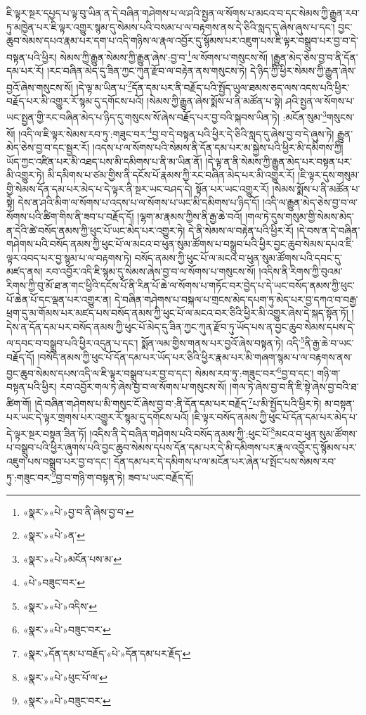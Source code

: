 ཇི་ལྟར་སྔར་དཔྱད་པ་ལྟ་བུ་ཡིན་ན་དེ་བཞིན་གཤེགས་པ་ལ་ཤའི་སྤྱན་ལ་སོགས་པ་མངའ་བ་དང་སེམས་ཀྱི་རྒྱུན་རབ་ཏུ་མཁྱེན་པར་ཇི་ལྟར་འགྱུར་སྙམ་དུ་སེམས་པའི་བསམ་པ་ལ་བརྟགས་ནས་དེ་ཅིའི་སླད་དུ་ཞེས་ཞུས་པ་དང་། བྱང་ཆུབ་སེམས་དཔའ་རྣམ་པར་དག་པ་འདི་གཉིས་ལ་རྣལ་འབྱོར་དུ་སྙོམས་པར་འཇུག་པས་ཇི་ལྟར་བསྒྲུབ་པར་བྱ་བ་དེ་བསྟན་པའི་ཕྱིར། སེམས་ཀྱི་རྒྱུན་སེམས་ཀྱི་རྒྱུན་ཞེས་:བྱ་བ་\footnote{«སྣར་»«པེ་»བྱ་བ་ནི་ཞེས་བྱ་བ་}ལ་སོགས་པ་གསུངས་སོ། །རྒྱུན་མེད་ཅེས་བྱ་བ་ནི་དོན་དམ་པར་རོ། །རང་བཞིན་མེད་དུ་ཟིན་ཀྱང་ཀུན་རྫོབ་ལ་བརྟེན་ནས་གསུངས་ཏེ། དེ་ཉིད་ཀྱི་ཕྱིར་སེམས་ཀྱི་རྒྱུན་ཞེས་བྱའོ་ཞེས་གསུངས་སོ། །དེ་ལྟ་མ་ཡིན་པ་\footnote{«སྣར་»«པེ་»ན་}དོན་དམ་པར་ནི་བརྗོད་པའི་སྤྱོད་ཡུལ་ཐམས་ཅད་ལས་འདས་པའི་ཕྱིར་བརྗོད་པར་མི་འགྱུར་རོ་སྙམ་དུ་དགོངས་པའོ། །སེམས་ཀྱི་རྒྱུན་ཞེས་སྨོས་པ་ནི་མཚོན་པ་སྟེ། ཤའི་སྤྱན་ལ་སོགས་པ་ཡང་སྤྱན་གྱི་རང་བཞིན་མེད་པ་ཉིད་དུ་གསུངས་སོ་ཞེས་བརྗོད་པར་བྱ་བའི་སྐབས་ཡིན་ཏེ། :མངོན་སུམ་\footnote{«སྣར་»«པེ་»མངོན་པས་མ་}གསུངས་སོ། །འདི་ལ་ཇི་ལྟར་སེམས་རབ་ཏུ་:གཟུང་བར་\footnote{«པེ་»བཟུང་བར་}བྱ་བ་དེ་བསྟན་པའི་ཕྱིར་དེ་ཅིའི་སླད་དུ་ཞེས་བྱ་བ་དེ་ཞུས་ཏེ། རྒྱུན་མེད་ཅེས་བྱ་བ་དང་སྦྱར་རོ། །འདས་པ་ལ་སོགས་པའི་སེམས་ནི་དོན་དམ་པར་མ་སྐྱེས་པའི་ཕྱིར་མི་དམིགས་ཀྱི། ཡོད་ཀྱང་འཛིན་པར་མི་འཐད་པས་མི་དམིགས་པ་ནི་མ་ཡིན་ནོ། །དེ་ལྟ་ན་ནི་སེམས་ཀྱི་རྒྱུན་མེད་པར་བསྟན་པར་མི་འགྱུར་ཏེ། མི་དམིགས་པ་ཙམ་གྱིས་ནི་དངོས་པོ་རྣམས་ཀྱི་རང་བཞིན་མེད་པར་མི་འགྱུར་རོ། །ཇི་ལྟར་དུས་གསུམ་གྱི་སེམས་དོན་དམ་པར་མེད་པ་དེ་ལྟར་ནི་སྔར་ཡང་བཤད་དེ། སྟོན་པར་ཡང་འགྱུར་རོ། །སེམས་སྨོས་པ་ནི་མཚོན་པ་སྟེ། དེས་ན་ཤའི་མིག་ལ་སོགས་པ་འདས་པ་ལ་སོགས་པ་ཡང་མི་དམིགས་པ་ཉིད་དོ། །འདི་ལ་རྒྱུན་མེད་ཅེས་བྱ་བ་ལ་སོགས་པའི་ཚིག་གིས་ནི་ཟབ་པ་བརྗོད་དོ། །ལྷག་མ་རྣམས་ཀྱིས་ནི་རྒྱ་ཆེ་བའོ། །གལ་ཏེ་དུས་གསུམ་གྱི་སེམས་མེད་ན་དེའི་ཚེ་བསོད་ནམས་ཀྱི་ཕུང་པོ་ཡང་མེད་པར་འགྱུར་ཏེ། དེ་ནི་སེམས་ལ་བརྟེན་པའི་ཕྱིར་རོ། །དེ་བས་ན་དེ་བཞིན་གཤེགས་པའི་བསོད་ནམས་ཀྱི་ཕུང་པོ་ལ་མངའ་བ་ཕུན་སུམ་ཚོགས་པ་བསྒྲུབ་པའི་ཕྱིར་བྱང་ཆུབ་སེམས་དཔའ་ཇི་ལྟར་འབད་པར་བྱ་སྙམ་པ་ལ་བརྟགས་ཏེ། བསོད་ནམས་ཀྱི་ཕུང་པོ་ལ་མངའ་བ་ཕུན་སུམ་ཚོགས་པའི་དབང་དུ་མཛད་ནས། རབ་འབྱོར་འདི་ཇི་སྙམ་དུ་སེམས་ཞེས་བྱ་བ་ལ་སོགས་པ་གསུངས་སོ། །འདིས་ནི་རིགས་ཀྱི་བུའམ་རིགས་ཀྱི་བུ་མོ་ཐ་ན་གང་ཕྱིའི་དངོས་པོ་ནི་རིན་པོ་ཆེ་ལ་སོགས་པ་གཏོང་བར་བྱེད་པ་དེ་ཡང་བསོད་ནམས་ཀྱི་ཕུང་པོ་ཆེན་པོ་དང་ལྡན་པར་འགྱུར་ན། དེ་བཞིན་གཤེགས་པ་བསྐལ་པ་གྲངས་མེད་དཔག་ཏུ་མེད་པར་བྱ་དཀའ་བ་བརྒྱ་ཕྲག་དུ་མ་གོམས་པར་མཛད་པས་བསོད་ནམས་ཀྱི་ཕུང་པོ་ལ་མངའ་བར་ཅིའི་ཕྱིར་མི་འགྱུར་ཞེས་དེ་སྐད་སྟོན་ཏོ། །དེས་ན་དོན་དམ་པར་བསོད་ནམས་ཀྱི་ཕུང་པོ་མེད་དུ་ཟིན་ཀྱང་ཀུན་རྫོབ་ཏུ་ཡོད་པས་ན་བྱང་ཆུབ་སེམས་དཔས་དེ་ལ་དབང་བ་བསྒྲུབ་པའི་ཕྱིར་འདུན་པ་དང་། སྨོན་ལམ་གྱིས་གནས་པར་བྱའོ་ཞེས་བསྟན་ཏེ། འདི་\footnote{«སྣར་»«པེ་»འདིས་}ནི་རྒྱ་ཆེ་བ་ཡང་བརྗོད་དོ། །བསོད་ནམས་ཀྱི་ཕུང་པོ་དོན་དམ་པར་ཡོད་པར་ཅིའི་ཕྱིར་རྣམ་པར་མི་གཞག་སྙམ་པ་ལ་བརྟགས་ནས་བྱང་ཆུབ་སེམས་དཔས་འདི་ལ་ཇི་ལྟར་བསྒྲུབ་པར་བྱ་བ་དང་། སེམས་རབ་ཏུ་:གཟུང་བར་\footnote{«སྣར་»«པེ་»བཟུང་བར་}བྱ་བ་དང་། གཉི་ག་བསྟན་པའི་ཕྱིར། རབ་འབྱོར་གལ་ཏེ་ཞེས་བྱ་བ་ལ་སོགས་པ་གསུངས་སོ། །གལ་ཏེ་ཞེས་བྱ་བ་ནི་ཇི་སྟེ་ཞེས་བྱ་བའི་ཐ་ཚིག་གོ། །དེ་བཞིན་གཤེགས་པ་མི་གསུང་ངོ་ཞེས་བྱ་བ་:ནི་དོན་དམ་པར་བརྗོད་\footnote{«སྣར་»དོན་དམ་པ་བརྗོད་«པེ་»དོན་དམ་པར་རྗོད་}པ་མི་སྤྱོད་པའི་ཕྱིར་ཏེ། མ་བསྟན་པར་ཡང་དེ་ལྟར་གྲགས་པར་འགྱུར་རོ་སྙམ་དུ་དགོངས་པའོ། །ཇི་ལྟར་བསོད་ནམས་ཀྱི་ཕུང་པོ་དོན་དམ་པར་མེད་པ་དེ་ལྟར་སྔར་བསྟན་ཟིན་ཏོ། །འདིས་ནི་དེ་བཞིན་གཤེགས་པའི་བསོད་ནམས་ཀྱི་:ཕུང་པོ་\footnote{«སྣར་»«པེ་»ཕུང་པོ་ལ་}མངའ་བ་ཕུན་སུམ་ཚོགས་པ་བསྒྲུབ་པའི་ཕྱིར་ཞུགས་པའི་བྱང་ཆུབ་སེམས་དཔས་དོན་དམ་པར་དེ་མི་དམིགས་པར་རྣལ་འབྱོར་དུ་སྙོམས་པར་འཇུག་པས་བསྒྲུབ་པར་བྱ་བ་དང་། དོན་དམ་པར་དེ་དམིགས་པ་ལ་མངོན་པར་ཞེན་པ་སྤོང་པས་སེམས་རབ་ཏུ་:གཟུང་བར་\footnote{«སྣར་»«པེ་»བཟུང་བར་}བྱ་བ་གཉི་ག་བསྟན་ཏེ། ཟབ་པ་ཡང་བརྗོད་དོ། 